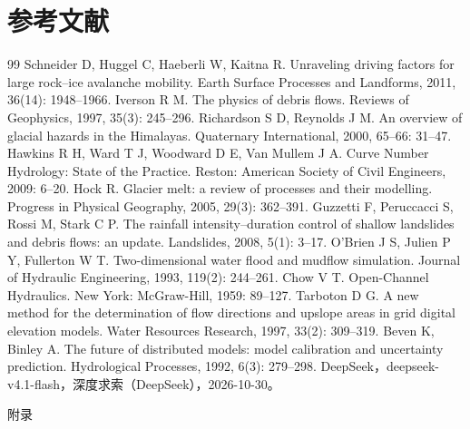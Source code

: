 \documentclass{MMCStyle}
\begin{document}
\section*{参考文献}
\vspace{-8pt}
\begingroup
\renewcommand{\section}[2]{}
\setlength{\itemsep}{-1pt}
\setlength{\parsep}{0pt}
\setlength{\partopsep}{0pt}
\setlength{\topsep}{0pt}

\small
\setlength{\parskip}{0pt}
\begin{thebibliography}{99}
Schneider D, Huggel C, Haeberli W, Kaitna R. Unraveling driving factors for large rock--ice avalanche mobility. Earth Surface Processes and Landforms, 2011, 36(14): 1948--1966.
Iverson R M. The physics of debris flows. Reviews of Geophysics, 1997, 35(3): 245--296.
Richardson S D, Reynolds J M. An overview of glacial hazards in the Himalayas. Quaternary International, 2000, 65--66: 31--47.
Hawkins R H, Ward T J, Woodward D E, Van Mullem J A. Curve Number Hydrology: State of the Practice. Reston: American Society of Civil Engineers, 2009: 6--20.
Hock R. Glacier melt: a review of processes and their modelling. Progress in Physical Geography, 2005, 29(3): 362--391.
Guzzetti F, Peruccacci S, Rossi M, Stark C P. The rainfall intensity--duration control of shallow landslides and debris flows: an update. Landslides, 2008, 5(1): 3--17.
O'Brien J S, Julien P Y, Fullerton W T. Two-dimensional water flood and mudflow simulation. Journal of Hydraulic Engineering, 1993, 119(2): 244--261.
Chow V T. Open-Channel Hydraulics. New York: McGraw-Hill, 1959: 89--127.
Tarboton D G. A new method for the determination of flow directions and upslope areas in grid digital elevation models. Water Resources Research, 1997, 33(2): 309--319.
Beven K, Binley A. The future of distributed models: model calibration and uncertainty prediction. Hydrological Processes, 1992, 6(3): 279--298.
DeepSeek，deepseek-v4.1-flash，深度求索（DeepSeek），2026-10-30。
\end{thebibliography}
\endgroup
\clearpage
\appendix
\begin{center}\heiti{} 附\hspace{1pc}录\end{center}
\end{document}

